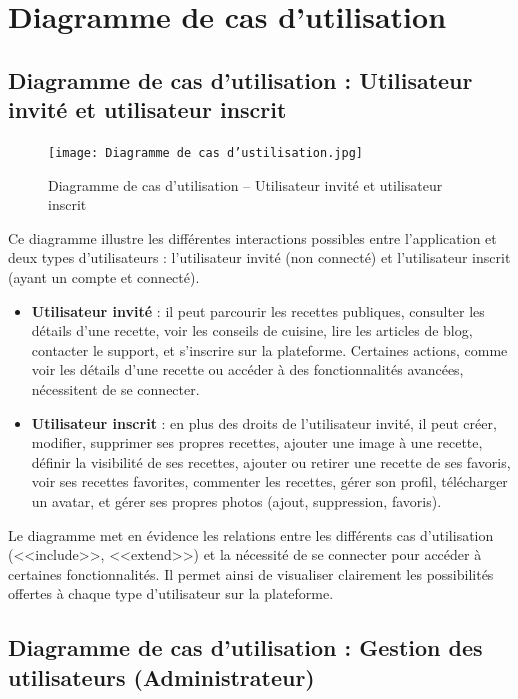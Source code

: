 \documentclass[12pt,a4paper]{report}
\begin{document}
\section{Diagramme de cas d’utilisation}
\subsection{Diagramme de cas d’utilisation : Utilisateur invité et utilisateur inscrit}

\begin{figure}[H]
    \centering
    \texttt{[image: Diagramme de cas d'ustilisation.jpg]}
    \caption{Diagramme de cas d’utilisation – Utilisateur invité et utilisateur inscrit}
    \label{fig:usecase_invite_inscrit}
\end{figure}

Ce diagramme illustre les différentes interactions possibles entre l’application et deux types d’utilisateurs : l’utilisateur invité (non connecté) et l’utilisateur inscrit (ayant un compte et connecté).

\begin{itemize}
    \item \textbf{Utilisateur invité} : il peut parcourir les recettes publiques, consulter les détails d’une recette, voir les conseils de cuisine, lire les articles de blog, contacter le support, et s’inscrire sur la plateforme. Certaines actions, comme voir les détails d’une recette ou accéder à des fonctionnalités avancées, nécessitent de se connecter.
    \item \textbf{Utilisateur inscrit} : en plus des droits de l’utilisateur invité, il peut créer, modifier, supprimer ses propres recettes, ajouter une image à une recette, définir la visibilité de ses recettes, ajouter ou retirer une recette de ses favoris, voir ses recettes favorites, commenter les recettes, gérer son profil, télécharger un avatar, et gérer ses propres photos (ajout, suppression, favoris).
\end{itemize}

Le diagramme met en évidence les relations entre les différents cas d’utilisation (<<include>>, <<extend>>) et la nécessité de se connecter pour accéder à certaines fonctionnalités. Il permet ainsi de visualiser clairement les possibilités offertes à chaque type d’utilisateur sur la plateforme.
\subsection{Diagramme de cas d’utilisation : Gestion des utilisateurs (Administrateur)}
\end{document}
